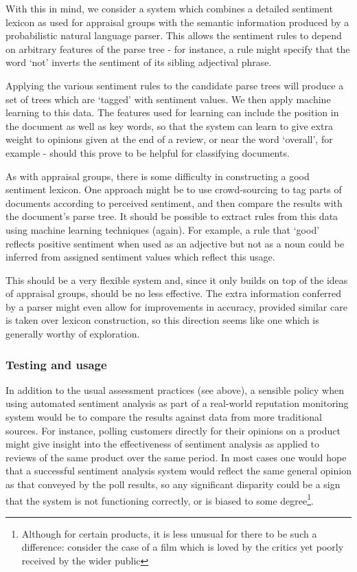 \documentclass[11pt]{article}
\begin{document}
With this in mind, we consider a system which combines a detailed sentiment
lexicon as used for appraisal groups\cite{Whitelaw2005} with the semantic
information produced by a probabilistic natural language parser. This allows
the sentiment rules to depend on arbitrary features of the parse tree - for
instance, a rule might specify that the word `not' inverts the sentiment of its
sibling adjectival phrase.

Applying the various sentiment rules to the candidate parse trees will produce
a set of trees which are `tagged' with sentiment values. We then apply machine
learning to this data. The features used for learning can include the position
in the document as well as key words, so that the system can learn to give
extra weight to opinions given at the end of a review, or near the word
`overall', for example - should this prove to be helpful for classifying
documents.

As with appraisal groups, there is some difficulty in constructing a good
sentiment lexicon. One approach might be to use crowd-sourcing to tag parts of
documents according to perceived sentiment, and then compare the results with
the document's parse tree. It should be possible to extract rules from this
data using machine learning techniques (again). For example, a rule that `good'
reflects positive sentiment when used as an adjective but not as a noun could
be inferred from assigned sentiment values which reflect this usage.

This should be a very flexible system and, since it only builds on top of the
ideas of appraisal groups, should be no less effective. The extra information
conferred by a parser might even allow for improvements in accuracy, provided
similar care is taken over lexicon construction, so this direction seems like
one which is generally worthy of exploration.

\subsubsection*{Testing and usage}
In addition to the usual assessment practices (see above), a sensible policy
when using automated sentiment analysis as part of a real-world reputation
monitoring system would be to compare the results against data from more
traditional sources. For instance, polling customers directly for their
opinions on a product might give insight into the effectiveness of sentiment
analysis as applied to reviews of the same product over the same period. In
most cases one would hope that a successful sentiment analysis system would
reflect the same general opinion as that conveyed by the poll results, so any
significant disparity could be a sign that the system is not functioning
correctly, or is biased to some degree\footnote{Although for certain products,
it is less unusual for there to be such a difference: consider the case of a
film which is loved by the critics yet poorly received by the wider public}.
\end{document}
